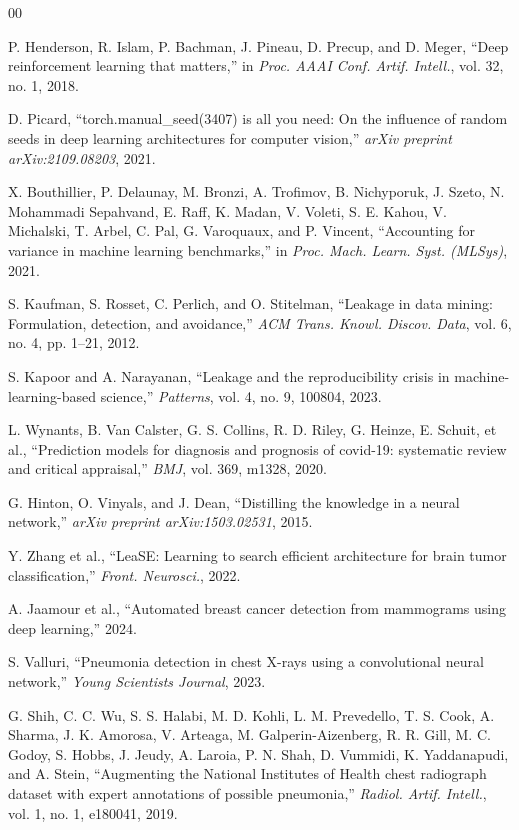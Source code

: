 \documentclass[conference]{IEEEtran}
\begin{document}
\begin{thebibliography}{00}

 P. Henderson, R. Islam, P. Bachman, J. Pineau, D. Precup, and D. Meger, ``Deep reinforcement learning that matters,'' in \emph{Proc. AAAI Conf. Artif. Intell.}, vol. 32, no. 1, 2018.

 D. Picard, ``torch.manual\_seed(3407) is all you need: On the influence of random seeds in deep learning architectures for computer vision,'' \emph{arXiv preprint arXiv:2109.08203}, 2021.

 X. Bouthillier, P. Delaunay, M. Bronzi, A. Trofimov, B. Nichyporuk, J. Szeto, N. Mohammadi Sepahvand, E. Raff, K. Madan, V. Voleti, S. E. Kahou, V. Michalski, T. Arbel, C. Pal, G. Varoquaux, and P. Vincent, ``Accounting for variance in machine learning benchmarks,'' in \emph{Proc. Mach. Learn. Syst. (MLSys)}, 2021.

 S. Kaufman, S. Rosset, C. Perlich, and O. Stitelman, ``Leakage in data mining: Formulation, detection, and avoidance,'' \emph{ACM Trans. Knowl. Discov. Data}, vol. 6, no. 4, pp. 1--21, 2012.

 S. Kapoor and A. Narayanan, ``Leakage and the reproducibility crisis in machine-learning-based science,'' \emph{Patterns}, vol. 4, no. 9, 100804, 2023.

 L. Wynants, B. Van Calster, G. S. Collins, R. D. Riley, G. Heinze, E. Schuit, et al., ``Prediction models for diagnosis and prognosis of covid-19: systematic review and critical appraisal,'' \emph{BMJ}, vol. 369, m1328, 2020.

 G. Hinton, O. Vinyals, and J. Dean, ``Distilling the knowledge in a neural network,'' \emph{arXiv preprint arXiv:1503.02531}, 2015.

 Y. Zhang et al., ``LeaSE: Learning to search efficient architecture for brain tumor classification,'' \emph{Front. Neurosci.}, 2022.

 A. Jaamour et al., ``Automated breast cancer detection from mammograms using deep learning,'' 2024.

 S. Valluri, ``Pneumonia detection in chest X-rays using a convolutional neural network,'' \emph{Young Scientists Journal}, 2023.

 G. Shih, C. C. Wu, S. S. Halabi, M. D. Kohli, L. M. Prevedello, T. S. Cook, A. Sharma, J. K. Amorosa, V. Arteaga, M. Galperin-Aizenberg, R. R. Gill, M. C. Godoy, S. Hobbs, J. Jeudy, A. Laroia, P. N. Shah, D. Vummidi, K. Yaddanapudi, and A. Stein, ``Augmenting the National Institutes of Health chest radiograph dataset with expert annotations of possible pneumonia,'' \emph{Radiol. Artif. Intell.}, vol. 1, no. 1, e180041, 2019.


\end{thebibliography}
\end{document}
